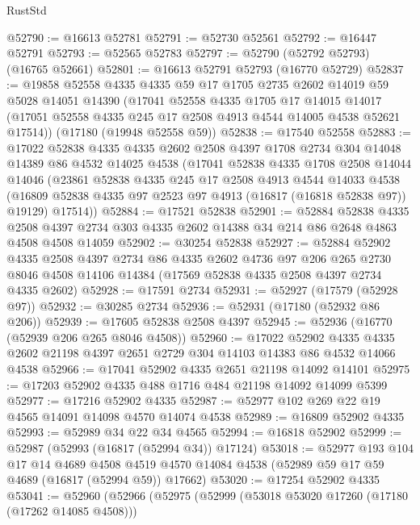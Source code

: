 \begin{lexlean}{RustStd}
\begin{coremodule}
{\begin{coremodule}
{{{{{{{{{{{{{{{{{{{{{{{{{{{{{{{{{{{{{{{{{{{{{{{{{{{{{{{@52790 := @16613 @52781
@52791 := @52730 @52561
@52792 := @16447 @52791
@52793 := @52565 @52783
@52797 := @52790 (@52792 @52793) (@16765 @52661)
@52801 := @16613 @52791 @52793 (@16770 @52729)
@52837 := @19858
    @52558
    @4335
    @4335
    @59
    @17
    @1705
    @2735
    @2602
    @14019
    @59
    @5028
    @14051
    @14390
    (@17041
      @52558
      @4335
      @1705
      @17
      @14015
      @14017
      (@17051 @52558 @4335 @245 @17 @2508 @4913 @4544 @14005 @4538 @52621 @17514))
    (@17180 (@19948 @52558 @59))
@52838 := @17540 @52558
@52883 := @17022
    @52838
    @4335
    @4335
    @2602
    @2508
    @4397
    @1708
    @2734
    @304
    @14048
    @14389
    @86
    @4532
    @14025
    @4538
    (@17041
      @52838
      @4335
      @1708
      @2508
      @14044
      @14046
      (@23861
        @52838
        @4335
        @245
        @17
        @2508
        @4913
        @4544
        @14033
        @4538
        (@16809 @52838 @4335 @97 @2523 @97 @4913 (@16817 (@16818 @52838 @97)) @19129)
        @17514))
@52884 := @17521 @52838
@52901 := @52884
    @52838
    @4335
    @2508
    @4397
    @2734
    @303
    @4335
    @2602
    @14388
    @34
    @214
    @86
    @2648
    @4863
    @4508
    @4508
    @14059
@52902 := @30254 @52838
@52927 := @52884
    @52902
    @4335
    @2508
    @4397
    @2734
    @86
    @4335
    @2602
    @4736
    @97
    @206
    @265
    @2730
    @8046
    @4508
    @14106
    @14384
    (@17569 @52838 @4335 @2508 @4397 @2734 @4335 @2602)
@52928 := @17591 @2734
@52931 := @52927 (@17579 (@52928 @97))
@52932 := @30285 @2734
@52936 := @52931 (@17180 (@52932 @86 @206))
@52939 := @17605 @52838 @2508 @4397
@52945 := @52936 (@16770 (@52939 @206 @265 @8046 @4508))
@52960 := @17022
    @52902
    @4335
    @4335
    @2602
    @21198
    @4397
    @2651
    @2729
    @304
    @14103
    @14383
    @86
    @4532
    @14066
    @4538
@52966 := @17041 @52902 @4335 @2651 @21198 @14092 @14101
@52975 := @17203 @52902 @4335 @488 @1716 @484 @21198 @14092 @14099 @5399
@52977 := @17216 @52902 @4335
@52987 := @52977 @102 @269 @22 @19 @4565 @14091 @14098 @4570 @14074 @4538
@52989 := @16809 @52902 @4335
@52993 := @52989 @34 @22 @34 @4565
@52994 := @16818 @52902
@52999 := @52987 (@52993 (@16817 (@52994 @34)) @17124)
@53018 := @52977
    @193
    @104
    @17
    @14
    @4689
    @4508
    @4519
    @4570
    @14084
    @4538
    (@52989 @59 @17 @59 @4689 (@16817 (@52994 @59)) @17662)
@53020 := @17254 @52902 @4335
@53041 := @52960
    (@52966
      (@52975
        (@52999
          (@53018 @53020 @17260 (@17180 (@17262 @14085 @4508)))
}}}}}}}}}}}}}}}}}}}}}}}}}}}}}}}}}}}}}}}}}}}}}}}}}}}}}}}
\end{coremodule}}
\end{coremodule}
\end{lexlean}
